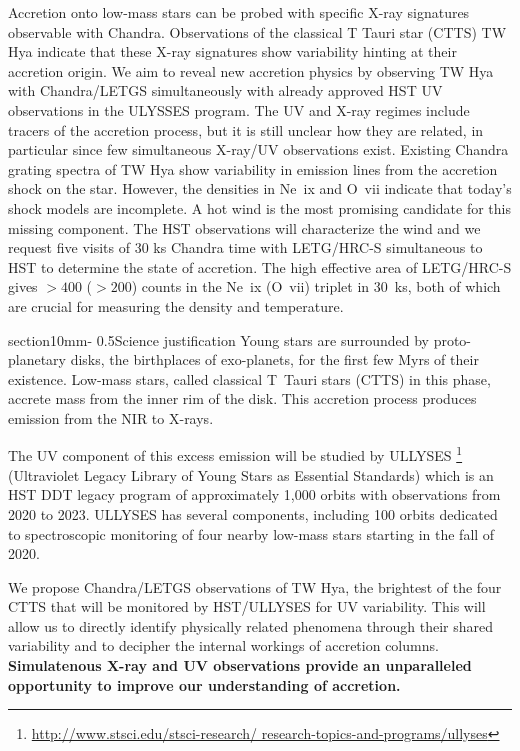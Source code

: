 \documentclass[letterpaper,11pt,twocolumn]{article}
\makeatletter
\renewcommand{\section}{\@startsection%
{section}{1}{0mm}{-\baselineskip}%
{0.5\baselineskip}{\normalfont\Large\bfseries}}%
\makeatother
\begin{document}
Accretion onto low-mass stars can be probed with specific X-ray
signatures observable with Chandra. Observations of the
classical T Tauri star (CTTS) TW Hya indicate that these X-ray
signatures show variability hinting at their accretion origin. We aim
to reveal new accretion physics by observing TW Hya with Chandra/LETGS
simultaneously with already approved HST UV observations in the ULYSSES
program.
The UV and X-ray regimes include tracers of the
accretion process, but it is still unclear how they are related, in
particular since few simultaneous X-ray/UV observations
exist. Existing Chandra grating spectra of TW Hya show variability in emission
lines from the accretion shock on the star. However, the densities in
Ne~{\sc ix} and O~{\sc vii} indicate that today's shock models are
incomplete. A hot wind is the most promising candidate for this
missing component. The HST observations will characterize the wind and
we request five visits of 30 ks Chandra time with LETG/HRC-S
simultaneous to HST to determine the state of accretion. The high
effective area of LETG/HRC-S gives $> 400$ ($>200$) counts in the Ne~{\sc ix} (O~{\sc vii}) triplet in 30~ks, both of which are
crucial for measuring the density and temperature.


\section{Science justification}
Young stars are surrounded by proto-planetary disks, the birthplaces of exo-planets, for the first few Myrs of their existence. Low-mass stars, called classical T~Tauri stars (CTTS) in this phase, accrete mass from the inner rim of the disk. This accretion process produces emission from the NIR to X-rays.

The UV component of this excess emission will be studied by ULLYSES 
\footnote{\url{http://www.stsci.edu/stsci-research/ research-topics-and-programs/ullyses}}
(Ultraviolet Legacy Library of Young Stars as Essential Standards) which is an HST DDT legacy program of  approximately 1,000 orbits with observations from 2020 to 2023. ULLYSES has several components, including 100 orbits dedicated to spectroscopic monitoring of four nearby low-mass stars  starting in the fall of 2020.

We propose Chandra/LETGS observations of TW Hya, the brightest of the four  CTTS that will be monitored by HST/ULLYSES for UV variability.
This will allow us to directly identify physically related phenomena through
their shared variability and to decipher the internal workings of accretion columns.  {\bf Simulatenous X-ray and UV
observations provide an unparalleled opportunity to improve
our understanding of accretion.}
\end{document}
